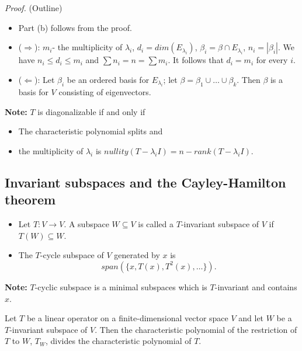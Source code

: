\documentclass[12pt]{article}
\newenvironment{theorem}[2][Theorem]{\begin{trivlist}
\item[\hskip \labelsep {\bfseries #1}\hskip \labelsep {\bfseries #2.}]}{\end{trivlist}}
\newenvironment{definition}[2][Definition]{\begin{trivlist}
\item[\hskip \labelsep {\bfseries #1}\hskip \labelsep {\bfseries #2}]}{\end{trivlist}}
\begin{document}
\textit{Proof.} (Outline)
\begin{itemize}
    \item Part (b) follows from the proof.
    
    \item ($\Longrightarrow$): $m_i$- the multiplicity of $\lambda_i$, $d_i = dim(E_{\lambda_i})$, $\beta_i = \beta \cap E_{\lambda_i}$, $n_i = | \beta_i |$. We have $n_i \leq d_i \leq m_i$ and $\sum n_i = n = \sum m_i$. It follows that $d_i = m_i$ for every $i$.
    
    \item ($\Longleftarrow$): Let $\beta_i$ be an ordered basis for $E_{\lambda_i}$; let $\beta = \beta_1 \cup \dots \cup \beta_k$. Then $\beta$ is a basis for $V$ consisting of eigenvectors.
\end{itemize}

\noindent \textbf{Note:} $T$ is diagonalizable if and only if 
\begin{itemize}
    \item The characteristic polynomial splits and
    \item the multiplicity of $\lambda_i$ is $nullity(T - \lambda_iI) = n - rank(T - \lambda_iI)$.
\end{itemize}

\setcounter{subsection}{3}

\subsection{Invariant subspaces and the Cayley-Hamilton theorem}

\begin{definition}{6} \text{ }
\begin{itemize}
    \item Let $T : V \to V$. A subspace $W \subseteq V$ is called a $T$-invariant subspace of $V$ if $T(W) \subseteq W$.
    
    \item The $T$-cycle subspace of $V$ generated by $x$ is $$span(\{x, T(x), T^2(x), \dots\}).$$
\end{itemize}
\end{definition}

\textbf{Note:} $T$-cyclic subspace is a minimal subspaces which is $T$-invariant and contains $x$.

\begin{theorem}{5.21}
Let $T$ be a linear operator on a finite-dimensional vector space $V$ and let $W$ be a $T$-invariant subspace of $V$. Then the characteristic polynomial of the restriction of $T$ to $W$, $T_W$, divides the characteristic polynomial of $T$. 
\end{theorem}
\end{document}

